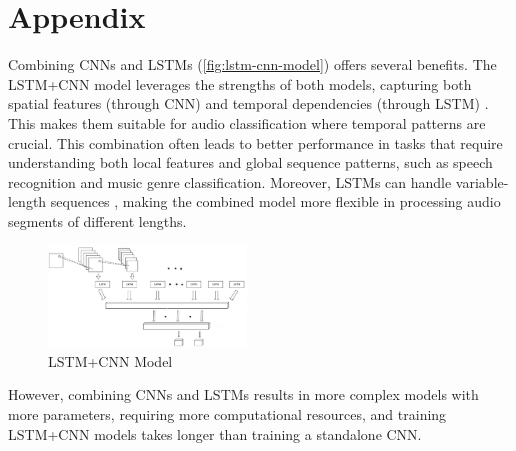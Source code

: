 \documentclass[twocolumn]{article}
\begin{document}
\section{Appendix}
Combining CNNs and LSTMs (\autoref{fig:lstm-cnn-model}) offers several benefits. The LSTM+CNN model leverages
the strengths of both models, capturing both spatial features (through CNN) and
temporal dependencies (through LSTM) \cite{sainath2015convolutional}.
This makes them suitable for audio classification where temporal patterns are crucial.
This combination often leads to better performance in tasks that require understanding both
local features and global sequence patterns, such as speech recognition and music genre
classification. Moreover, LSTMs can handle variable-length sequences \cite{lim2020time},
making the combined model more flexible in processing audio segments of different lengths.

\vspace{-1em}
\begin{figure}[H]
  \centering
  \includegraphics[width=0.47\textwidth]{LSTM-CNN-model.png}
  \caption{LSTM+CNN Model}
  \label{fig:lstm-cnn-model}
\end{figure}
\vspace{-1em}

However, combining CNNs and LSTMs results in more complex models with more parameters,
requiring more computational resources, and training LSTM+CNN models takes longer than
training a standalone CNN.

\printbibliography
\end{document}
